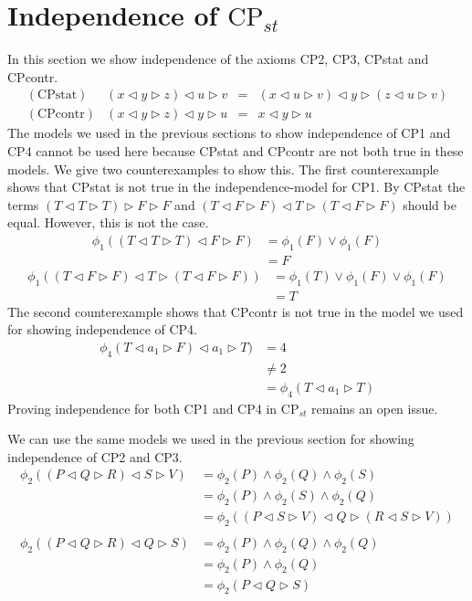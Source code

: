 \documentclass[a4paper,twoside,openright]{report}
\newcommand{\CPcontr}{\ensuremath{\mathrm{CPcontr}}}
\newcommand{\CPstat}{\ensuremath{\mathrm{CPstat}}}
\newcommand{\lef}{\ensuremath{\triangleleft}}
\newcommand{\rig}{\ensuremath{\triangleright}}
\begin{document}
\section{Independence of $\text{CP}_{st}$}
In this section we show independence of the axioms CP2, CP3, CPstat and CPcontr.
\[
\begin{array}{lrcl}
(\CPstat) & (x\lef y\rig z)\lef u\rig v & = & (x\lef u\rig v)\lef y\rig(z\lef u\rig v)\\
(\CPcontr) & (x\lef y\rig z)\lef y\rig u &= & x\lef y\rig u
\end{array}
\]
The models we used in the previous sections to show independence of CP1 and CP4 cannot be used here because CPstat and CPcontr are not both true in these models. We give two counterexamples to show this. The first counterexample shows that CPstat is not true in the independence-model for CP1. By CPstat the terms $(T\lef T\rig T)\rig F\rig F$ and $(T\lef F\rig F)\lef T\rig (T\lef F\rig F)$ should be equal. However, this is not the case.
\begin{align*}
\phi_1((T\lef T\rig T)\lef F\rig F)
&=\phi_1(F)\vee\phi_1(F)\\
&= F
\end{align*} 
\begin{align*}
\phi_1((T\lef F\rig F)\lef T\rig(T\lef F\rig F))
&=\phi_1(T)\vee\phi_1(F)\vee\phi_1(F)\\
&=T
\end{align*}
The second counterexample shows that CPcontr is not true in the model we used for showing independence of CP4.
\begin{align*}
\phi_4(T\lef a_1\rig F)\lef a_1\rig T)
&= 4\\
&\ne 2\\
&=\phi_4(T\lef a_1\rig T)
\end{align*}
Proving independence for both CP1 and CP4 in $\text{CP}_{st}$ remains an open issue.

We can use the same models we used in the previous section for showing independence of CP2 and CP3.
\begin{align*}
\phi_2((P\lef Q\rig R)\lef S\rig V)
&=\phi_2(P)\wedge\phi_2(Q)\wedge\phi_2(S)\\
&=\phi_2(P)\wedge\phi_2(S)\wedge\phi_2(Q)\\
&=\phi_2((P\lef S\rig V)\lef Q\rig(R\lef S\rig V))\\\\
\phi_2((P\lef Q\rig R)\lef Q\rig S)
&=\phi_2(P)\wedge\phi_2(Q)\wedge\phi_2(Q)\\
&=\phi_2(P)\wedge\phi_2(Q)\\
&=\phi_2(P\lef Q\rig S)
\end{align*}
\end{document}
